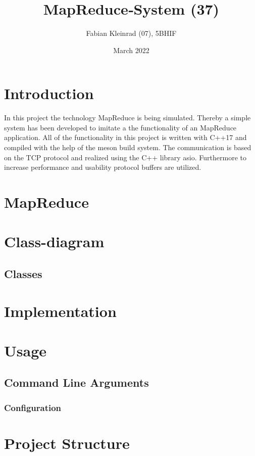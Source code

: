 \documentclass[12pt, letterpaper]{article}
\title{MapReduce‐System (37)}
\author{Fabian Kleinrad (07), 5BHIF}
\date{March 2022}
\begin{document}
\begin{titlepage}
\maketitle
\end{titlepage}

\tableofcontents
\newpage

\section{Introduction}

In this project the technology MapReduce is being simulated. Thereby a simple system has been developed to imitate a the functionality of an MapReduce application. All of the functionality in this project is written with C++17 and compiled with the help of the meson build system. The communication is based on the TCP protocol and realized using the C++ library asio. Furthermore to increase performance and usability protocol buffers are utilized.  
\section{MapReduce}

\section{Class-diagram}


\subsection{Classes}


\section{Implementation}


\section{Usage}
\label{usage}

\subsection{Command Line Arguments}

\subsubsection{Configuration}


\newpage

\section{Project Structure}


\newpage

\printbibliography
\end{document}
